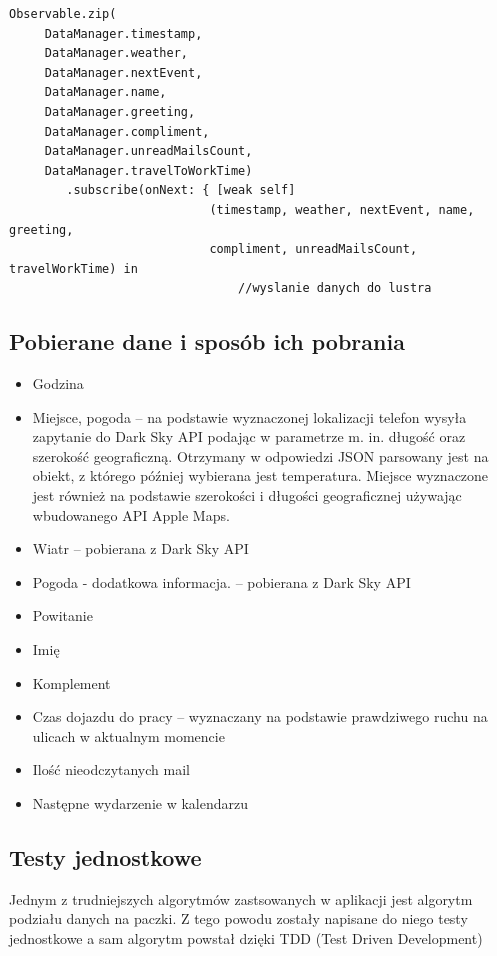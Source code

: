 \documentclass[a4paper,11pt]{article}
\begin{document}
\begin{lstlisting}
Observable.zip(
	 DataManager.timestamp,
	 DataManager.weather,
	 DataManager.nextEvent, 
	 DataManager.name,
	 DataManager.greeting, 
	 DataManager.compliment, 
	 DataManager.unreadMailsCount, 
	 DataManager.travelToWorkTime)
	  	.subscribe(onNext: { [weak self] 
	  						(timestamp, weather, nextEvent, name, greeting,
	  						compliment, unreadMailsCount, travelWorkTime) in
	  							//wyslanie danych do lustra
\end{lstlisting}

\subsection{Pobierane dane i sposób ich pobrania}

\begin{itemize}
	\item Godzina
	\item Miejsce, pogoda -- na podstawie wyznaczonej lokalizacji telefon wysyła zapytanie do Dark Sky API podając w parametrze m. in. długość oraz szerokość geograficzną. Otrzymany w odpowiedzi JSON parsowany jest na obiekt, z którego później wybierana jest temperatura. Miejsce wyznaczone jest również na podstawie szerokości i długości geograficznej używając wbudowanego  API Apple Maps.
	\item Wiatr -- pobierana z Dark Sky API
	\item Pogoda - dodatkowa informacja. -- pobierana z Dark Sky API
	\item Powitanie
	\item Imię
	\item Komplement
	\item Czas dojazdu do pracy -- wyznaczany na podstawie prawdziwego ruchu na ulicach w aktualnym momencie
	\item Ilość nieodczytanych mail
	\item Następne wydarzenie w kalendarzu
	
\end{itemize}

\subsection{Testy jednostkowe}
Jednym z trudniejszych algorytmów zastsowanych w aplikacji jest algorytm podziału danych na paczki. Z tego powodu zostały napisane do niego testy jednostkowe a sam algorytm powstał dzięki TDD (Test Driven Development)
\end{document}
